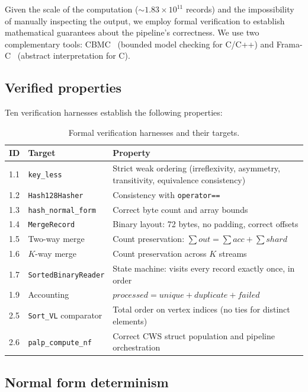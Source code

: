 \documentclass[12pt,a4paper]{article}
\theoremstyle{definition}
\begin{document}
Given the scale of the computation ($\sim 1.83 \times 10^{11}$ records)
and the impossibility of manually inspecting the output, we employ formal
verification to establish mathematical guarantees about the pipeline's
correctness.  We use two complementary tools: CBMC~\cite{CBMC} (bounded
model checking for C/C++) and Frama-C~\cite{FramaC} (abstract
interpretation for C).

\subsection{Verified properties}

Ten verification harnesses establish the following properties:

\begin{table}[h]
\centering
\caption{Formal verification harnesses and their targets.}
\label{tab:harnesses}
\small
\begin{tabular}{@{}llp{7cm}@{}}
\toprule
ID & Target & Property \\
\midrule
1.1 & \texttt{key\_less} & Strict weak ordering (irreflexivity, asymmetry,
      transitivity, equivalence consistency) \\
1.2 & \texttt{Hash128Hasher} & Consistency with \texttt{operator==} \\
1.3 & \texttt{hash\_normal\_form} & Correct byte count and array bounds \\
1.4 & \texttt{MergeRecord} & Binary layout: 72 bytes, no padding, correct
      offsets \\
1.5 & Two-way merge & Count preservation: $\sum \mathit{out} = \sum \mathit{acc}
      + \sum \mathit{shard}$ \\
1.6 & $K$-way merge & Count preservation across $K$ streams \\
1.7 & \texttt{SortedBinaryReader} & State machine: visits every record
      exactly once, in order \\
1.9 & Accounting & $\mathit{processed} = \mathit{unique} + \mathit{duplicate}
      + \mathit{failed}$ \\
2.5 & \texttt{Sort\_VL} comparator & Total order on vertex indices (no
      ties for distinct elements) \\
2.6 & \texttt{palp\_compute\_nf} & Correct CWS struct population and
      pipeline orchestration \\
\bottomrule
\end{tabular}
\end{table}

\subsection{Normal form determinism}
\end{document}

